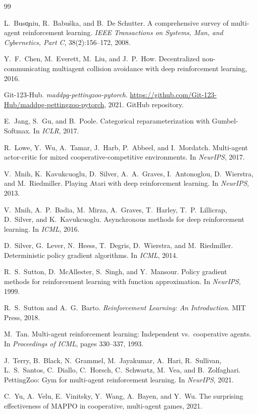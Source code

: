 \documentclass[12pt]{article}
\begin{document}

\begin{thebibliography}{99}

L.\ Bus\c{o}niu, R.\ Babu\v{s}ka, and B.\ De Schutter.
A comprehensive survey of multi-agent reinforcement learning.
\textit{IEEE Transactions on Systems, Man, and Cybernetics, Part C}, 38(2):156--172, 2008.

Y.\ F.\ Chen, M.\ Everett, M.\ Liu, and J.\ P.\ How.
Decentralized non-communicating multiagent collision avoidance with deep reinforcement learning, 2016.

Git-123-Hub.
\textit{maddpg-pettingzoo-pytorch}.
\url{https://github.com/Git-123-Hub/maddpg-pettingzoo-pytorch}, 2021.
GitHub repository.

E.\ Jang, S.\ Gu, and B.\ Poole.
Categorical reparameterization with Gumbel-Softmax.
In \textit{ICLR}, 2017.

R.\ Lowe, Y.\ Wu, A.\ Tamar, J.\ Harb, P.\ Abbeel, and I.\ Mordatch.
Multi-agent actor-critic for mixed cooperative-competitive environments.
In \textit{NeurIPS}, 2017.

V.\ Mnih, K.\ Kavukcuoglu, D.\ Silver, A.\ A.\ Graves, I.\ Antonoglou, D.\ Wierstra,
and M.\ Riedmiller.
Playing Atari with deep reinforcement learning.
In \textit{NeurIPS}, 2013.

V.\ Mnih, A.\ P.\ Badia, M.\ Mirza, A.\ Graves, T.\ Harley, T.\ P.\ Lillicrap,
D.\ Silver, and K.\ Kavukcuoglu.
Asynchronous methods for deep reinforcement learning.
In \textit{ICML}, 2016.

D.\ Silver, G.\ Lever, N.\ Heess, T.\ Degris, D.\ Wierstra, and M.\ Riedmiller.
Deterministic policy gradient algorithms.
In \textit{ICML}, 2014.

R.\ S.\ Sutton, D.\ McAllester, S.\ Singh, and Y.\ Mansour.
Policy gradient methods for reinforcement learning with function approximation.
In \textit{NeurIPS}, 1999.

R.\ S.\ Sutton and A.\ G.\ Barto.
\textit{Reinforcement Learning: An Introduction}.
MIT Press, 2018.

M.\ Tan.
Multi-agent reinforcement learning: Independent vs.\ cooperative agents.
In \textit{Proceedings of ICML}, pages 330--337, 1993.

J.\ Terry, B.\ Black, N.\ Grammel, M.\ Jayakumar, A.\ Hari, R.\ Sullivan, L.\ S.\ Santos,
C.\ Diallo, C.\ Horsch, C.\ Schwartz, M.\ Vea, and B.\ Zolfaghari.
PettingZoo: Gym for multi-agent reinforcement learning.
In \textit{NeurIPS}, 2021.

C.\ Yu, A.\ Velu, E.\ Vinitsky, Y.\ Wang, A.\ Bayen, and Y.\ Wu.
The surprising effectiveness of MAPPO in cooperative, multi-agent games, 2021.

\end{thebibliography}
\end{document}
